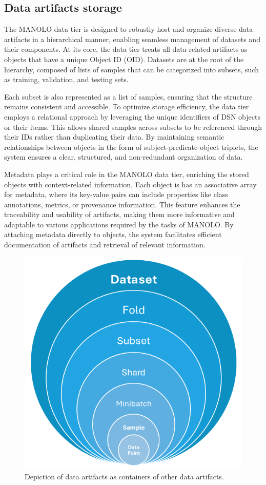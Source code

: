 \subsection{Data artifacts storage}
The MANOLO data tier is designed to robustly host and organize diverse data artifacts in a hierarchical manner, enabling seamless management of datasets and their components. At its core, the data tier treats all data-related artifacts as objects that have a unique Object ID (OID). Datasets are at the root of the hierarchy,  composed of lists of samples that can be categorized into subsets, such as training, validation, and testing sets. 

Each subset is also represented as a list of samples, ensuring that the structure remains consistent and accessible. To optimize storage efficiency, the data tier employs a relational approach by leveraging the unique identifiers of DSN objects or their items. This allows shared samples across subsets to be referenced through their IDs rather than duplicating their data. By maintaining semantic relationships between objects in the form of subject-predicate-object triplets, the system ensures a clear, structured, and non-redundant organization of data.

Metadata plays a critical role in the MANOLO data tier, enriching the stored objects with context-related information. Each object is has an associative array for metadata, where its key-value pairs can include properties like class annotations, metrics, or provenance information. This feature enhances the traceability and usability of artifacts, making them more informative and adaptable to various applications required by the tasks of MANOLO. By attaching metadata directly to objects, the system facilitates efficient documentation of artifacts and retrieval of relevant information.

\begin{figure}[h!]
    \vskip -0.1in 
    \centering
    \includegraphics[width=0.4\columnwidth]{fig_datatier/DataTier-Onion.png} 
    \vspace{-0.2in}
    \caption{Depiction of data artifacts as containers of other data artifacts. \label{fig:datatier-onion}}
\end{figure}



